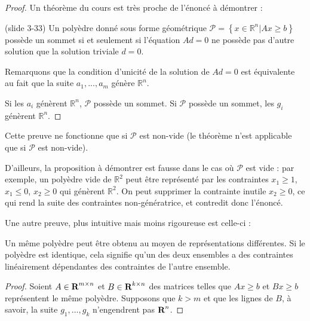 \begin{enumerate}
    \begin{solution}
        \begin{proof}
        Un théorème du cours est très proche de l'énoncé à démontrer :

        \begin{theorem}{(slide 3-33)}
            Un polyèdre donné sous forme géométrique
            $\mathcal{P} = \left\{ x\in \mathbb{R}^n | Ax \geq b\right\}$
            possède un sommet si et seulement si l'équation $Ad=0$ ne
            possède pas d'autre solution que la solution triviale $d=0$.
        \end{theorem}

        Remarquons que la condition d'unicité de la solution de $Ad=0$ est équivalente
        au fait que la suite $a_1, ..., a_m$ génère $\mathbb{R}^n$.

        Si les $a_i$ génèrent $\mathbb{R}^n$, $\mathcal{P}$ possède un sommet.
        Si $\mathcal{P}$ possède un sommet, les $g_i$ génèrent $\mathbb{R}^n$.
        \end{proof}

        Cette preuve ne fonctionne que si $\mathcal{P}$ est non-vide (le théorème
        n'est applicable que si $\mathcal{P}$ est non-vide).

        D'ailleurs, la proposition à démontrer est fausse dans le cas où $\mathcal{P}$
        est vide : par exemple, un polyèdre vide de $\mathbb{R}^2$ peut être
        représenté par les contraintes $x_1 \geq 1$, $x_1 \leq 0$, $x_2 \geq 0$
        qui génèrent $\mathbb{R}^2$. On peut supprimer la contrainte \og{}inutile\fg{}
        $x_2 \geq 0$, ce qui rend la suite des contraintes non-génératrice, et
        contredit donc l'énoncé.

        Une autre preuve, plus intuitive mais moins rigoureuse est celle-ci :

      Un même polyèdre peut être obtenu au moyen de
      représentations différentes.
      Si le polyèdre est identique,
      cela signifie qu'un des deux ensembles a des contraintes linéairement
      dépendantes des contraintes de l'autre ensemble.
      \begin{proof}

        Soient $A \in {\mbox{\bf R}}^{m \times n} $ et $B \in {\mbox{\bf R}}^{k \times n} $ des matrices
        telles que $Ax \geq b$ et $Bx \geq b$ représentent le même polyèdre.
        Supposons que $ k > m$ et que les lignes de $B$, à savoir,
        la suite $g_{1}, \dots, g_{k}$ n'engendrent pas ${\mbox{\bf R}}^{n}$.


\end{proof}
\end{solution}
\end{enumerate}
